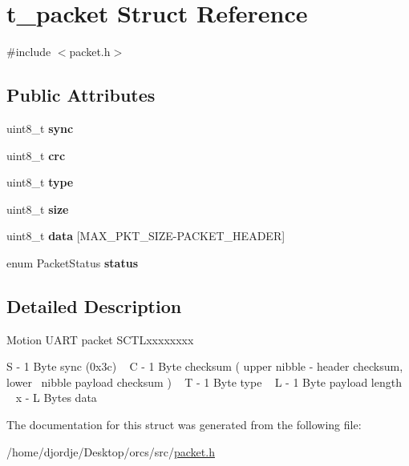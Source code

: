 \hypertarget{structt__packet}{}\section{t\+\_\+packet Struct Reference}
\label{structt__packet}


{\ttfamily \#include $<$packet.\+h$>$}

\subsection*{Public Attributes}
\begin{DoxyCompactItemize}
\item 
uint8\+\_\+t {\bfseries sync}\hypertarget{structt__packet_aba8830ef7476e6706053278c355dfda1}{}\label{structt__packet_aba8830ef7476e6706053278c355dfda1}

\item 
uint8\+\_\+t {\bfseries crc}\hypertarget{structt__packet_a8fb9fbfdea388fb8fa1c026c1d0184c5}{}\label{structt__packet_a8fb9fbfdea388fb8fa1c026c1d0184c5}

\item 
uint8\+\_\+t {\bfseries type}\hypertarget{structt__packet_a3a8d61b09635be4a12cc08f3bfad9131}{}\label{structt__packet_a3a8d61b09635be4a12cc08f3bfad9131}

\item 
uint8\+\_\+t {\bfseries size}\hypertarget{structt__packet_a9678638d00fac4b2f1b11ce1721b5004}{}\label{structt__packet_a9678638d00fac4b2f1b11ce1721b5004}

\item 
uint8\+\_\+t {\bfseries data} \mbox{[}M\+A\+X\+\_\+\+P\+K\+T\+\_\+\+S\+I\+ZE-\/P\+A\+C\+K\+E\+T\+\_\+\+H\+E\+A\+D\+ER\mbox{]}\hypertarget{structt__packet_a09a36988d9e3f087bac9db87cc7d9ebd}{}\label{structt__packet_a09a36988d9e3f087bac9db87cc7d9ebd}

\item 
enum Packet\+Status {\bfseries status}\hypertarget{structt__packet_a1d52305a9a0486e304f5531b3728a7ff}{}\label{structt__packet_a1d52305a9a0486e304f5531b3728a7ff}

\end{DoxyCompactItemize}


\subsection{Detailed Description}
Motion U\+A\+RT packet S\+C\+T\+Lxxxxxxxx

S -\/ 1 Byte sync (0x3c) ~\newline
 C -\/ 1 Byte checksum ( upper nibble -\/ header checksum, lower~\newline
 nibble payload checksum ) ~\newline
 T -\/ 1 Byte type ~\newline
 L -\/ 1 Byte payload length ~\newline
 x -\/ L Bytes data 

The documentation for this struct was generated from the following file\+:\begin{DoxyCompactItemize}
\item 
/home/djordje/\+Desktop/orcs/src/\hyperlink{packet_8h}{packet.\+h}\end{DoxyCompactItemize}
